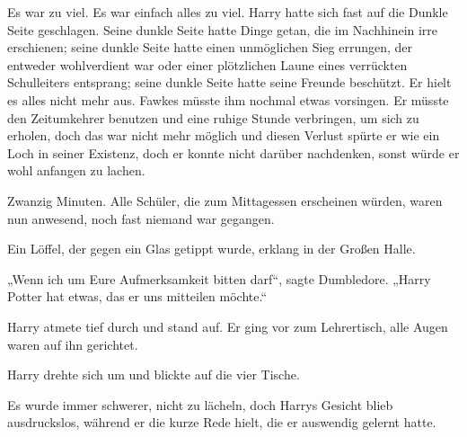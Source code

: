 Es war zu viel. Es war einfach alles zu viel. Harry hatte sich fast auf die Dunkle Seite geschlagen. Seine dunkle Seite hatte Dinge getan, die im Nachhinein irre erschienen; seine dunkle Seite hatte einen unmöglichen Sieg errungen, der entweder wohlverdient war oder einer plötzlichen Laune eines verrückten Schulleiters entsprang; seine dunkle Seite hatte seine Freunde beschützt. Er hielt es alles nicht mehr aus. Fawkes müsste ihm nochmal etwas vorsingen. Er müsste den Zeitumkehrer benutzen und eine ruhige Stunde verbringen, um sich zu erholen, doch das war nicht mehr möglich und diesen Verlust spürte er wie ein Loch in seiner Existenz, doch er konnte nicht darüber nachdenken, sonst würde er wohl anfangen zu lachen.

Zwanzig Minuten. Alle Schüler, die zum Mittagessen erscheinen würden, waren nun anwesend, noch fast niemand war gegangen.

Ein Löffel, der gegen ein Glas getippt wurde, erklang in der Großen Halle.

„Wenn ich um Eure Aufmerksamkeit bitten darf“, sagte Dumbledore. „Harry Potter hat etwas, das er uns mitteilen möchte.“

Harry atmete tief durch und stand auf. Er ging vor zum Lehrertisch, alle Augen waren auf ihn gerichtet.

Harry drehte sich um und blickte auf die vier Tische.

Es wurde immer schwerer, nicht zu lächeln, doch Harrys Gesicht blieb ausdruckslos, während er die kurze Rede hielt, die er auswendig gelernt hatte.


